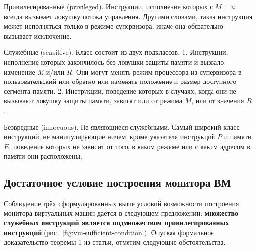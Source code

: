 \begin{description*}
\item[Привилегированные (\abbr privileged).] Инструкции, исполнение которых с $M = u$ всегда вызывает ловушку потока управления. Другими словами, такая инструкция может исполняться только в режиме супервизора, иначе она обязательно вызывает исключение.

\item[Служебные (\abbr sensitive\footnotemark).] Класс состоит из двух подклассов. 1. Инструкции, исполнение которых закончилось без ловушки защиты памяти и вызвало изменение $M$ и/или $R$. Они могут менять режим процессора из супервизора в пользовательский или обратно или изменять положение и размер доступного сегмента памяти. 2. Инструкции, поведение которых в случаях, когда они не вызывают ловушку защиты памяти, зависят или от режима $M$, или от значения $R$.

\item[Безвредные (\abbr innocuous).] Не являющиеся служебными. Самый широкий класс инструкций, не манипулирующие ничем, кроме указателя инструкций $P$ и памяти $E$, поведение которых не зависит от того, в каком режиме или с каким адресом в памяти они расположены.

\end{description*}

\subsection[Достаточное условие]{Достаточное условие построения монитора ВМ} 

Соблюдение трёх сформулированных выше условий возможности построения монитора виртуальных машин даётся в следующем предложении: \textbf{множество служебных инструкций является подмножеством привилегированных инструкций} (рис.~\ref{fig:vm-sufficient-condition}). Опуская формальное доказательство теоремы 1 из статьи, отметим следующие обстоятельства.


